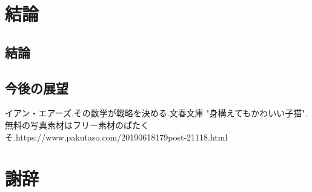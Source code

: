 \documentclass[11pt,a4j]{jreport}
\begin{document}
 \chapter{結論}
  
  \section{結論}

  \section{今後の展望} 
  
  
 \begin{thebibliography}{99}
  イアン・エアーズ.その数学が戦略を決める.文春文庫
  "身構えてもかわいい子猫".無料の写真素材はフリー素材のぱたくそ.https://www.pakutaso.com/20190618179post-21118.html
 \end{thebibliography} 
  
 \chapter*{謝辞}
  
  
\end{document}
